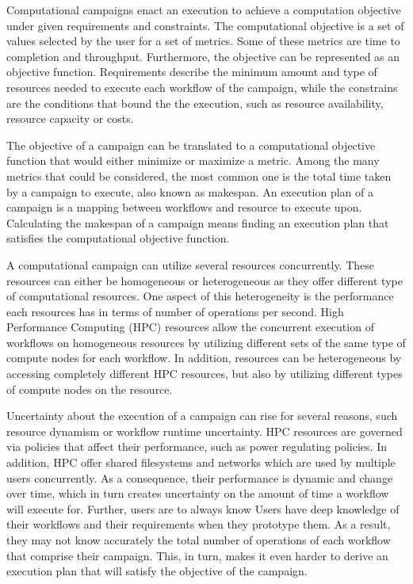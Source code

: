 \label{ch:campaigns}
Computational campaigns enact an execution to achieve a computation objective under given requirements and constraints.
The computational objective is a set of values selected by the user for a set of metrics.
Some of these metrics are time to completion and throughput.
Furthermore, the objective can be represented as an objective function.
Requirements describe the minimum amount and type of resources needed to execute each workflow of the campaign, while the constrains are the conditions that bound the the execution, such as resource availability, resource capacity or costs.

The objective of a campaign can be translated to a computational objective function that would either minimize or maximize a metric.
Among the many metrics that could be considered, the most common one is the total time taken by a campaign to execute, also known as makespan.
An execution plan of a campaign is a mapping between workflows and resource to execute upon.
Calculating the makespan of a campaign means finding an execution plan that satisfies the computational objective function.

A computational campaign can utilize several resources concurrently.
These resources can either be homogeneous or heterogeneous as they offer different type of computational resources.
One aspect of this heterogeneity is the performance each resources has in terms of number of operations per second.
High Performance Computing (HPC) resources allow the concurrent execution of workflows on homogeneous resources by utilizing different sets of the same type of compute nodes for each workflow.
In addition, resources can be heterogeneous by accessing completely different HPC resources, but also by utilizing different types of compute nodes on the resource.

Uncertainty about the execution of a campaign can rise for several reasons, such resource dynamism or workflow runtime uncertainty.
HPC resources are governed via policies that affect their performance, such as power regulating policies.
In addition, HPC offer shared filesystems and networks which are used by multiple users concurrently.
As a consequence, their performance is dynamic and change over time, which in turn creates uncertainty on the amount of time a workflow will execute for.
Further, users are to always know 
Users have deep knowledge of their workflows and their requirements when they prototype them.
As a result, they may not know accurately the total number of operations of each workflow that comprise their campaign.
This, in turn, makes it even harder to derive an execution plan that will satisfy the objective of the campaign. 


